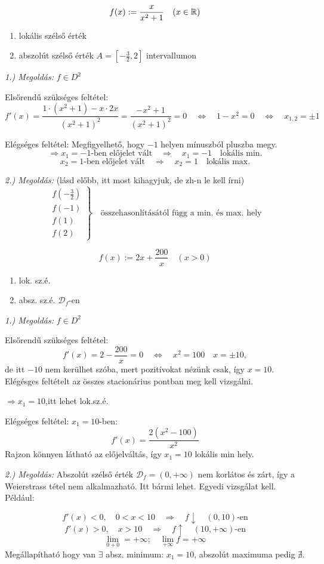 \documentclass[a4paper,11.5pt]{article}
\begin{document}
	\begin{task}
		\[ f(x):=\frac{x}{x^2+1}\quad (x\in\mathbb{R}) \]
		\begin{enumerate}[1.)]
			\item lokális szélső érték
			\item abszolút szélső érték $A=\left[-\frac{3}{2},2\right]$ intervallumon
		\end{enumerate}
		
		\textit{1.) Megoldás:} $f\in D^2$
		
		Elsőrendű szükséges feltétel:
		\[ f'(x)=\frac{1\cdot(x^2+1)-x\cdot 2x}{(x^2+1)^2}=\frac{-x^2+1}{(x^2+1)^2}=0 \quad  \Leftrightarrow \quad 1-x^2=0\quad \Leftrightarrow\quad x_{1,2}=\pm1 \]
		
		Elégséges feltétel: Megfigyelhető, hogy $-1$ helyen mínuszból pluszba megy.
		\[ \Rightarrow x_1=-1\text{-ben előjelet vált}\quad \Rightarrow\quad x_1=-1\quad \text{lokális min.} \]
		\[ x_2=1\text{-ben előjelet vált}\quad \Rightarrow\quad x_2=1 \quad \text{lokális max.} \]
		
		\textit{2.) Megoldás:} (lásd előbb, itt most kihagyjuk, de zh-n le kell írni)
		\[ \left.\begin{gathered}
		f\left(-\frac{3}{2}\right)\\
		f\left(-1\right)\\
		f(1)\\
		f(2)
		\end{gathered}\right\}\quad \text{összehasonlításától függ a min. és max. hely} \]
	\end{task}
	\begin{task}
		\[ f(x):=2x+\frac{200}{x}\quad (x>0) \]
		\begin{enumerate}
			\item lok. sz.é.
			\item absz. sz.é. $\mathcal{D}_f$-en
		\end{enumerate}
		\textit{1.) Megoldás:} $f\in D^2$
		
		Elsőrendű szükséges feltétel:
		\[ f'(x)=2-\frac{200}{x}=0\quad \Leftrightarrow\quad x^2=100\quad x=\pm 10,\]
		de itt $-10$ nem kerülhet szóba, mert pozitívokat nézünk csak, így $x=10$. Elégésges feltételt az összes stacionárius pontban meg kell vizsgálni.
		
		$\Rightarrow x_1=10$,\quad itt lehet lok.sz.é.
		
		Elégséges feltétel: $x_1=10$-ben:
		\[ f'(x)=\frac{2(x^2-100)}{x^2} \]
		Rajzon könnyen látható az előjelváltás, így $x_1=10$ lokális min hely.
		
		\textit{2.) Megoldás:} Abszolút szélső érték
		$\mathcal{D}_f=(0,+\infty)$ nem korlátos és zárt, így a Weierstrass tétel nem alkalmazható. Itt bármi lehet. Egyedi vizsgálat kell. Például:
		
		\[ f'(x)<0,\quad 0<x<10\quad \Rightarrow\quad f\downarrow \quad (0,10)\text{-en} \]
		\[ f'(x)>0,\quad x>10\quad \Rightarrow\quad f\uparrow\quad (10,+\infty)\text{-en} \]
		\[ \lim_{0+0}=+\infty;\quad \lim_{+\infty}f=+\infty \]
		Megállapítható hogy van $\exists$ absz. minimum: $x_1=10$, abszolút maximuma pedig $\nexists$.
	\end{task}
\end{document}
